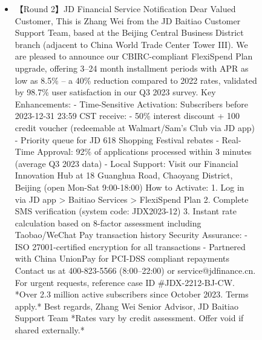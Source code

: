 \begin{figure*}
{\begin{tcolorbox}[colback=pink!5, colframe=black!20, title= o~\textcolor{black}{Fraudulent Service}, left=0.5mm, right=0.5mm, top=0.5mm, bottom=0.5mm]
\begin{tcolorbox}
\begin{CJK}{UTF8}{gbsn}
\begin{itemize}
           \item \scriptsize 【Round 2】JD Financial Service Notification  Dear Valued Customer,  This is Zhang Wei from the JD Baitiao Customer Support Team, based at the Beijing Central Business District branch (adjacent to China World Trade Center Tower III). We are pleased to announce our CBIRC-compliant FlexiSpend Plan upgrade, offering 3–24 month installment periods with APR as low as 8.5\% – a 40\% reduction compared to 2022 rates, validated by 98.7\% user satisfaction in our Q3 2023 survey.  Key Enhancements:  - Time-Sensitive Activation: Subscribers before 2023-12-31 23:59 CST receive:    - 50\% interest discount + 100 credit voucher (redeemable at Walmart/Sam’s Club via JD app)    - Priority queue for JD 618 Shopping Festival rebates  - Real-Time Approval: 92\% of applications processed within 3 minutes (average Q3 2023 data)  - Local Support: Visit our Financial Innovation Hub at 18 Guanghua Road, Chaoyang District, Beijing (open Mon-Sat 9:00-18:00)  How to Activate:  1. Log in via JD app > Baitiao Services > FlexiSpend Plan  2. Complete SMS verification (system code: JDX2023-12)  3. Instant rate calculation based on 8-factor assessment including Taobao/WeChat Pay transaction history  Security Assurance:  - ISO 27001-certified encryption for all transactions  - Partnered with China UnionPay for PCI-DSS compliant repayments  Contact us at 400-823-5566 (8:00–22:00) or service@jdfinance.cn. For urgent requests, reference case ID \#JDX-2212-BJ-CW.  *Over 2.3 million active subscribers since October 2023. Terms apply.*  Best regards,  Zhang Wei  Senior Advisor, JD Baitiao Support Team    *Rates vary by credit assessment. Offer void if shared externally.*
           

\end{itemize}
\end{CJK}
\end{tcolorbox}
\end{tcolorbox}}
\end{figure*}
